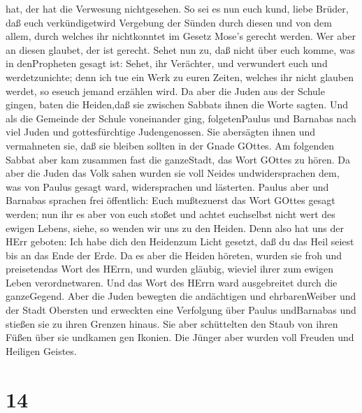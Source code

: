hat, der hat die Verwesung nichtgesehen.  So sei es nun
euch kund, liebe Brüder, daß euch verkündigetwird Vergebung der Sünden
durch diesen und von dem allem, durch welches ihr nichtkonntet im Gesetz
Mose's gerecht werden.  Wer aber an diesen glaubet, der ist
gerecht.  Sehet nun zu, daß nicht über euch komme, was in
denPropheten gesagt ist:  Sehet, ihr Verächter, und
verwundert euch und werdetzunichte; denn ich tue ein Werk zu euren
Zeiten, welches ihr nicht glauben werdet, so eseuch jemand erzählen
wird.  Da aber die Juden aus der Schule gingen, baten die
Heiden,daß sie zwischen Sabbats ihnen die Worte sagten. 
Und als die Gemeinde der Schule voneinander ging, folgetenPaulus und
Barnabas nach viel Juden und gottesfürchtige Judengenossen. Sie
abersägten ihnen und vermahneten sie, daß sie bleiben sollten in der
Gnade GOttes.  Am folgenden Sabbat aber kam zusammen fast
die ganzeStadt, das Wort GOttes zu hören.  Da aber die
Juden das Volk sahen wurden sie voll Neides undwidersprachen dem, was
von Paulus gesagt ward, widersprachen und lästerten. 
Paulus aber und Barnabas sprachen frei öffentlich: Euch mußtezuerst das
Wort GOttes gesagt werden; nun ihr es aber von euch stoßet und achtet
euchselbst nicht wert des ewigen Lebens, siehe, so wenden wir uns zu den
Heiden.  Denn also hat uns der HErr geboten: Ich habe dich
den Heidenzum Licht gesetzt, daß du das Heil seiest bis an das Ende der
Erde.  Da es aber die Heiden höreten, wurden sie froh und
preisetendas Wort des HErrn, und wurden gläubig, wieviel ihrer zum
ewigen Leben verordnetwaren.  Und das Wort des HErrn ward
ausgebreitet durch die ganzeGegend.  Aber die Juden
bewegten die andächtigen und ehrbarenWeiber und der Stadt Obersten und
erweckten eine Verfolgung über Paulus undBarnabas und stießen sie zu
ihren Grenzen hinaus.  Sie aber schüttelten den Staub von
ihren Füßen über sie undkamen gen Ikonien.  Die Jünger aber
wurden voll Freuden und Heiligen Geistes.

\hypertarget{section-13}{%
\section{14}\label{section-13}}

